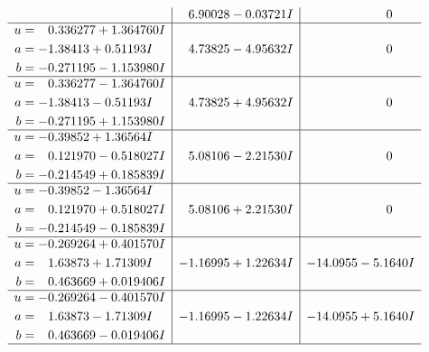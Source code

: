 \documentclass[1p]{elsarticle_modified}
\theoremstyle{definition}
\begin{document}
$$\begin{array}{c|c|c}
 & \phantom{-}6.90028 - 0.03721 I & \phantom{-0.000000 } 0 \\ \hline\begin{aligned}
u &= \phantom{-}0.336277 + 1.364760 I \\
a &= -1.38413 + 0.51193 I \\
b &= -0.271195 - 1.153980 I\end{aligned}
 & \phantom{-}4.73825 - 4.95632 I & \phantom{-0.000000 } 0 \\ \hline\begin{aligned}
u &= \phantom{-}0.336277 - 1.364760 I \\
a &= -1.38413 - 0.51193 I \\
b &= -0.271195 + 1.153980 I\end{aligned}
 & \phantom{-}4.73825 + 4.95632 I & \phantom{-0.000000 } 0 \\ \hline\begin{aligned}
u &= -0.39852 + 1.36564 I \\
a &= \phantom{-}0.121970 - 0.518027 I \\
b &= -0.214549 + 0.185839 I\end{aligned}
 & \phantom{-}5.08106 - 2.21530 I & \phantom{-0.000000 } 0 \\ \hline\begin{aligned}
u &= -0.39852 - 1.36564 I \\
a &= \phantom{-}0.121970 + 0.518027 I \\
b &= -0.214549 - 0.185839 I\end{aligned}
 & \phantom{-}5.08106 + 2.21530 I & \phantom{-0.000000 } 0 \\ \hline\begin{aligned}
u &= -0.269264 + 0.401570 I \\
a &= \phantom{-}1.63873 + 1.71309 I \\
b &= \phantom{-}0.463669 + 0.019406 I\end{aligned}
 & -1.16995 + 1.22634 I & -14.0955 - 5.1640 I \\ \hline\begin{aligned}
u &= -0.269264 - 0.401570 I \\
a &= \phantom{-}1.63873 - 1.71309 I \\
b &= \phantom{-}0.463669 - 0.019406 I\end{aligned}
 & -1.16995 - 1.22634 I & -14.0955 + 5.1640 I\\
 \hline 
 \end{array}$$\newpage$$\begin{array}{c|c|c}  

\end{array}$$
\end{document}
